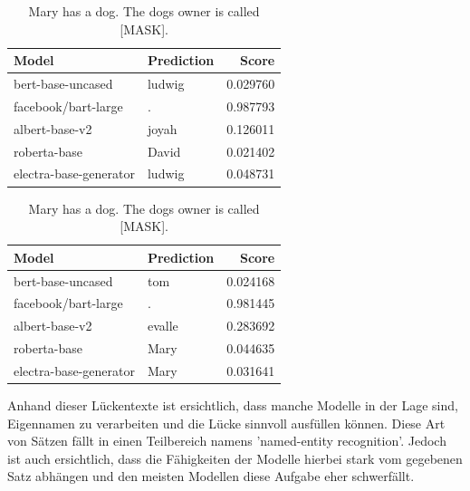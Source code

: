 \documentclass[a4paper, 11pt]{article}          %
\begin{document}
\newpage
\begin{table}[ht]
\centering
\scriptsize
\begin{minipage}[t]{0.48\linewidth}
\centering
\caption*{Mary's dog is called Ludwig. Ludwigs owner is [MASK].}
\begin{tabular}{llr}
\toprule
Model & Prediction & Score \\
\midrule
bert-base-uncased & ludwig & 0.029760 \\
facebook/bart-large & . & 0.987793 \\
albert-base-v2 & joyah & 0.126011 \\
roberta-base & David & 0.021402 \\
electra-base-generator & ludwig & 0.048731 \\
\bottomrule
\end{tabular}
\end{minipage}
\hfill
\begin{minipage}[t]{0.48\linewidth}
\centering
\caption*{Mary has a dog. The dogs owner is called [MASK].}
\begin{tabular}{llr}
\toprule
Model & Prediction & Score \\
\midrule
bert-base-uncased & tom & 0.024168 \\
facebook/bart-large & . & 0.981445 \\
albert-base-v2 & evalle & 0.283692 \\
roberta-base & Mary & 0.044635 \\
electra-base-generator & Mary & 0.031641 \\
\bottomrule
\end{tabular}
\end{minipage}
\end{table}

Anhand dieser Lückentexte ist ersichtlich, 
dass manche Modelle in der Lage sind, Eigennamen zu verarbeiten und die Lücke sinnvoll ausfüllen können.
Diese Art von Sätzen fällt in einen Teilbereich namens 'named-entity recognition'.
Jedoch ist auch ersichtlich, dass die Fähigkeiten der Modelle hierbei stark vom gegebenen Satz abhängen 
und den meisten Modellen diese Aufgabe eher schwerfällt.

\vspace{4em}
\end{document}
